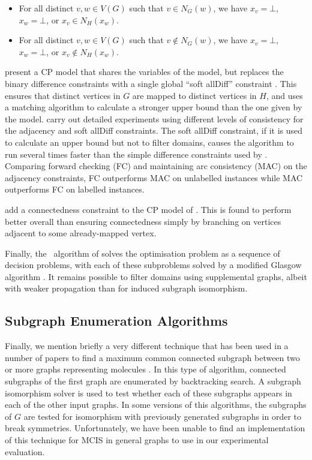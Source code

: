 \begin{itemize}
    \item For all distinct $v, w \in V(G)$ such that $v \in N_G(w)$, we have 
$x_v=\bot$,
$x_w=\bot$, or
$x_v \in N_H(x_w)$.
\item For all distinct $v, w \in V(G)$ such that $v \not\in N_G(w)$, we have 
$x_v=\bot$,
$x_w=\bot$, or
$x_v \not\in N_H(x_w)$.
\end{itemize}

\citet{DBLP:conf/cp/NdiayeS11} present a CP model that shares the variables
of the \citeauthor{DBLP:conf/mco/VismaraV08} model, but replaces the binary difference
constraints with a single global ``soft allDiff''
constraint \citep{DBLP:conf/cp/PetitRB01}.  This ensures that distinct vertices
in $G$ are mapped to distinct vertices in $H$, and uses a matching algorithm
to calculate a stronger upper bound than the one given by
the \citeauthor{DBLP:conf/mco/VismaraV08} model.
\citeauthor{DBLP:conf/cp/NdiayeS11} carry out detailed experiments using
different levels of consistency for the adjacency and soft allDiff constraints.
The soft allDiff constraint, if it is used to calculate an upper bound but
not to filter domains, causes the algorithm to run several times faster
than the simple difference constraints used by \citeauthor{DBLP:conf/mco/VismaraV08}.
Comparing forward checking (FC) and maintaining arc consistency (MAC)
on the adjacency constraints, FC outperforms MAC on unlabelled instances
while MAC outperforms FC on labelled instances.

\cite{DBLP:conf/cp/McCreeshNPS16} add a connectedness constraint to the CP
model of \citet{DBLP:conf/cp/NdiayeS11}.  This is found to perform better
overall than ensuring connectedness simply by branching on vertices adjacent to
some already-mapped vertex.

Finally, the \kDown\ algorithm of \citet{UpcomingAAAIPaper}
solves the optimisation problem as a sequence of decision problems, with
each of these subproblems solved by a modified Glasgow algorithm
\citep{DBLP:conf/cp/McCreeshP15}.  It remains possible to filter
domains using supplemental graphs, albeit with weaker propagation
than for induced subgraph isomorphism.

\subsection{Subgraph Enumeration Algorithms}

Finally, we mention briefly a very different technique that has been used
in a number of papers to find a maximum common connected subgraph between two or more
graphs representing molecules
\citep{armitage1967automatic,takahashi1987recognition,DBLP:journals/jcheminf/DalkeH13}.
In this type of algorithm, connected
subgraphs of the first graph are enumerated by backtracking search.
A subgraph isomorphism solver is used to test whether each of these subgraphs
appears in each of the other input graphs.  In some versions of this algorithms,
the subgraphs of $G$ are tested for isomorphism with previously generated subgraphs
in order to break symmetries.
Unfortunately, we have been unable to find an implementation of this technique
for MCIS in general graphs to use in our experimental evaluation.

